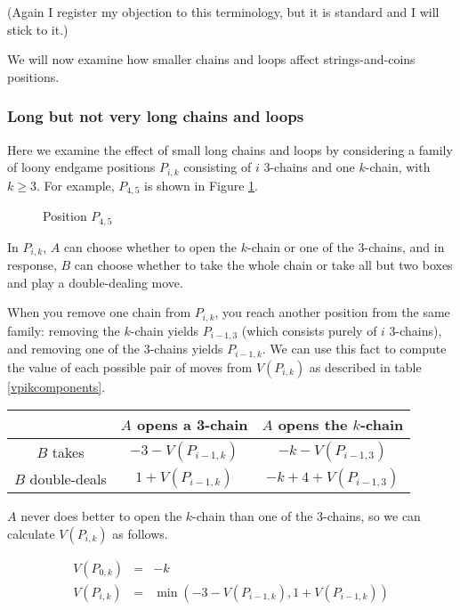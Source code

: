 \documentclass[a4paper,twocolumn]{article}
\begin{document}
(Again I register my objection to this terminology, but it is standard
and I will stick to it.)

We will now examine how smaller chains and loops affect
strings-and-coins positions.

\subsubsection{Long but not very long chains and loops}

Here we examine the effect of small long chains and loops by
considering a family of loony endgame positions $P_{i,k}$ consisting
of $i$ 3-chains and one $k$-chain, with $k \ge 3$. For example,
$P_{4,5}$ is shown in Figure \ref{p45}.

\begin{figure}
  \centering
  \def\svgscale{0.7}
  
  \caption{Position $P_{4,5}$}
  \label{p45}
\end{figure}

In $P_{i,k}$, $A$ can choose whether to open the $k$-chain or one of
the 3-chains, and in response, $B$ can choose whether to take the
whole chain or take all but two boxes and play a double-dealing move.

When you remove one chain from $P_{i,k}$, you reach another position
from the same family: removing the $k$-chain yields $P_{i-1,3}$ (which
consists purely of $i$ 3-chains), and removing one of the 3-chains
yields $P_{i-1,k}$. We can use this fact to compute the value of each
possible pair of moves from $V(P_{i,k})$ as described in table
\ref{vpikcomponents}.

\begin{table*}[tp]
  \centering
  \begin{tabular}{c | c c}
    & $A$ opens a 3-chain & $A$ opens the $k$-chain \\
    \hline
    $B$ takes & $-3-V(P_{i-1,k})$ & $-k-V(P_{i-1,3})$ \\
    $B$ double-deals & $1+V(P_{i-1,k})$ & $-k+4+V(P_{i-1,3})$
  \end{tabular}
  \caption{Values to $A$ of moves from $P_{i,k}$}
  \label{vpikcomponents}
\end{table*}

$A$ never does better to open the $k$-chain than one of the 3-chains,
so we can calculate $V(P_{i,k})$ as follows.

\begin{eqnarray*}
  V(P_{0,k}) & = & -k \\
  V(P_{i,k}) & = & \min(-3-V(P_{i-1,k}), 1+V(P_{i-1,k}))
\end{eqnarray*}
\end{document}
